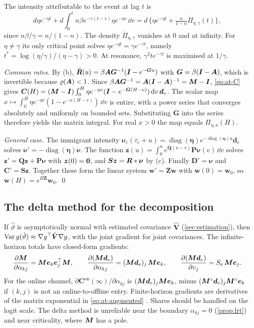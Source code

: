 The intensity attributable to the event at lag $t$ is
\[
d\eta e^{-\eta t}+d\int_0^tn\beta e^{-\gamma(t-v)}\eta e^{-\eta v}\,\dd v
=d\,\{\eta e^{-\eta t}+\tfrac{n}{1-n}\dot\Pi_{\eta,\gamma}(t)\},
\]
since $n\beta/\gamma=n/(1-n)$. The density $\dot\Pi_{\eta,\gamma}$ vanishes at $0$
and at infinity. For $\eta\neq\gamma$ its only critical point solves
$\eta e^{-\eta t}=\gamma e^{-\gamma t}$, namely $t^*=\log(\eta/\gamma)/(\eta-\gamma)>0$.
At resonance, $\gamma^2te^{-\gamma t}$ is maximised at $1/\gamma$.

\emph{Common rates.} By (b), $\bar{\bm{R}}(u)=\beta\bm{A}\bm G^{-1}(\bm{I}-e^{-\bm Gu})$ with
$\bm G=\beta(\bm{I}-\bm{A})$, which is invertible because $\varrho(\bm{A})<1$. Since
$\beta\bm{A}\bm G^{-1}=\bm{A}(\bm{I}-\bm{A})^{-1}=\bm{M}-\bm{I}$, \eqref{eq:at-C} gives
$\bm C(H)=(\bm{M}-\bm{I})\int_0^H\eta e^{-\eta v}(\bm{I}-e^{-\bm G(H-v)})\,\mathrm{d} v\,\bm d_e$.
The scalar map
$x\mapsto\int_0^H\eta e^{-\eta v}(1-e^{-x(H-v)})\,\dd v$ is entire, with a power series
that converges absolutely and uniformly on bounded sets. Substituting $\bm G$ into the
series therefore yields the matrix integral. For real $x>0$ the map equals
$\Pi_{\eta,x}(H)$.

\emph{General case.} The immigrant intensity
$\bm\nu_e(\tau_e+u)=\operatorname{diag}(\bm\eta)e^{-\operatorname{diag}(\bm\eta)u}\bm d_e$
solves $\bm\nu'=-\operatorname{diag}(\bm\eta)\bm\nu$. The function
$\bm z(u)=\int_0^ue^{\bm Q(u-v)}\bm P\bm\nu(v)\,\dd v$ solves
$\bm z'=\bm Q\bm z+\bm P\bm\nu$ with $\bm z(0)=\mathbf{0}$, and $\bm S\bm z=\bm{R}*\bm\nu$ by (c).
Finally $\bm D'=\bm\nu$ and $\bm C'=\bm S\bm z$. Together these form the linear system
$\bm w'=\bm Z\bm w$ with $\bm w(0)=\bm w_0$, so $\bm w(H)=e^{H\bm Z}\bm w_0$. \qed

\subsection{The delta method for the decomposition}\label{app:at-grad}

If $\hat\vartheta$ is asymptotically normal with estimated
covariance $\hat{\bm V}$ (\cref{sec:estimation}), then
$\operatorname{Var} g(\hat\vartheta)\approx\nabla g^{\top}\hat{\bm V}\nabla g$, with the joint gradient
for joint covariances. The infinite-horizon totals have closed-form gradients:
\begin{equation}\label{eq:at-grad}
  \frac{\partial\bm{M}}{\partial\alpha_{kj}}=\bm{M}\bm e_k\bm e_j^{\top}\bm{M},\qquad
  \frac{\partial(\bm{M}\bm d_e)}{\partial\alpha_{kj}}=(\bm{M}\bm d_e)_j\,\bm{M}\bm e_k,\qquad
  \frac{\partial(\bm{M}\bm d_e)}{\partial\upsilon_{j}}=S_e\,\bm{M}\bm e_j .
\end{equation}
For the online channel, $\partial\bm C^{\mathrm{on}}(\infty)/\partial\alpha_{kj}$ is
$(\bm{M}\bm d_e)_j\bm{M}\bm e_k$, minus $(\bm{M}^\circ\bm d_e)_j\bm{M}^\circ\bm e_k$ if
$(k,j)$ is not an online-to-offline entry. Finite-horizon gradients are derivatives of
the matrix exponential in \eqref{eq:at-augmented} \citep{vanloan1978}. Shares should be
handled on the logit scale. The delta method is unreliable near the boundary
$\alpha_{kj}=0$ (\cref{prop:lrt}) and near criticality, where $\bm{M}$ has a pole.


